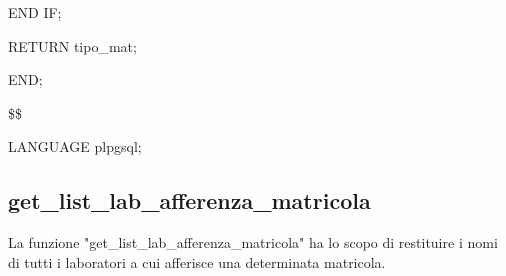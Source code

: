 \begin{flushleft}
\begin{description}
\begin{description}
                                        \item END IF;
                                        \item RETURN tipo\_mat;                                   
                                \end{description}
                            \item END;
                            \item \$\$
                            \item LANGUAGE plpgsql;
                        \end{description}
                    \end{flushleft}
                \normalfont  
    
\newpage
    
                \subsection{get\_list\_lab\_afferenza\_matricola}
                La funzione "get\_list\_lab\_afferenza\_matricola" ha lo scopo di restituire i nomi di tutti i laboratori a cui afferisce una determinata matricola.
                    \ttfamily

